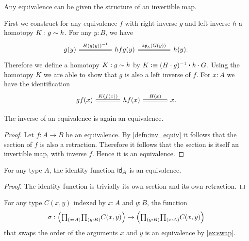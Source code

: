 \begin{defn}\label{defn:inv_equiv}
Any equivalence can be given the structure of an invertible map.
\end{defn}

\begin{constr}
First we construct for any equivalence $f$ with right inverse $g$ and left inverse $h$ a homotopy $K:g\htpy h$. For any $y:B$, we have 
\begin{equation*}
\begin{tikzcd}[column sep=huge]
g(y) \arrow[r,equals,"H(g(y))^{-1}"] & hfg(y) \arrow[r,equals,"\ap{h}{G(y)}"] & h(y).
\end{tikzcd}
\end{equation*} 
Therefore we define a homotopy $K:g\htpy h$ by $K\defeq \ct{(H\cdot g)^{-1}}{h\cdot G}$.
Using the homotopy $K$ we are able to show that $g$ is also a left inverse of $f$. For $x:A$ we have the identification
\begin{equation*}
\begin{tikzcd}[column sep=large]
gf(x) \arrow[r,equals,"K(f(x))"] & hf(x) \arrow[r,equals,"H(x)"] & x.
\end{tikzcd}\qedhere
\end{equation*}
\end{constr}

\begin{cor}
The inverse of an equivalence is again an equivalence.
\end{cor}

\begin{proof}
Let $f:A\to B$ be an equivalence. By \cref{defn:inv_equiv} it follows that the section of $f$ is also a retraction. Therefore it follows that the section is itself an invertible map, with inverse $f$. Hence it is an equivalence.
\end{proof}

\begin{thm}\label{thm:id_equiv}
For any type $A$, the identity function $\idfunc[A]$ is an equivalence.
\end{thm}

\begin{proof}
The identity function is trivially its own section and its own retraction.
\end{proof}

\begin{eg}
  For any type $C(x,y)$ indexed by $x:A$ and $y:B$, the function
\begin{equation*}
\sigma:\Big(\prd{x:A}{y:B}C(x,y)\Big)\to\Big(\prd{y:B}{x:A}C(x,y)\Big)
\end{equation*}
that swaps the order of the arguments $x$ and $y$ is an equivalence by \cref{ex:swap}.
\end{eg}

